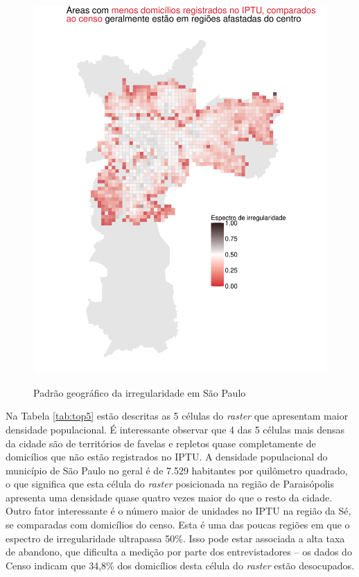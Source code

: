 \begin{apendicesenv}
\begin{figure}[h]
    \caption{Padrão geográfico da irregularidade em São Paulo}
    \centering
    \includegraphics[width = .8\linewidth]{figuras/balanco_raster.pdf}
    \label{fig:balanco-raster}
\end{figure}



Na Tabela \ref{tab:top5} estão descritas as 5 células do \textit{raster} que apresentam maior densidade populacional. É interessante observar que 4 das 5 células mais densas da cidade são de territórios de favelas e repletos quase completamente de domicílios que não estão registrados no IPTU. A densidade populacional do município de São Paulo no geral é de 7.529 habitantes por quilômetro quadrado, o que significa que esta célula do \textit{raster} posicionada na região de Paraisópolis apresenta uma densidade quase quatro vezes maior do que o resto da cidade. Outro fator interessante é o número maior de unidades no IPTU na região da Sé, se comparadas com domicílios do censo. Esta é uma das poucas regiões em que o espectro de irregularidade ultrapassa 50\%. Isso pode estar associada a alta taxa de abandono, que dificulta a medição por parte dos entrevistadores -- os dados do Censo indicam que 34,8\% dos domicílios desta célula do \textit{raster} estão desocupados.


\end{apendicesenv}
